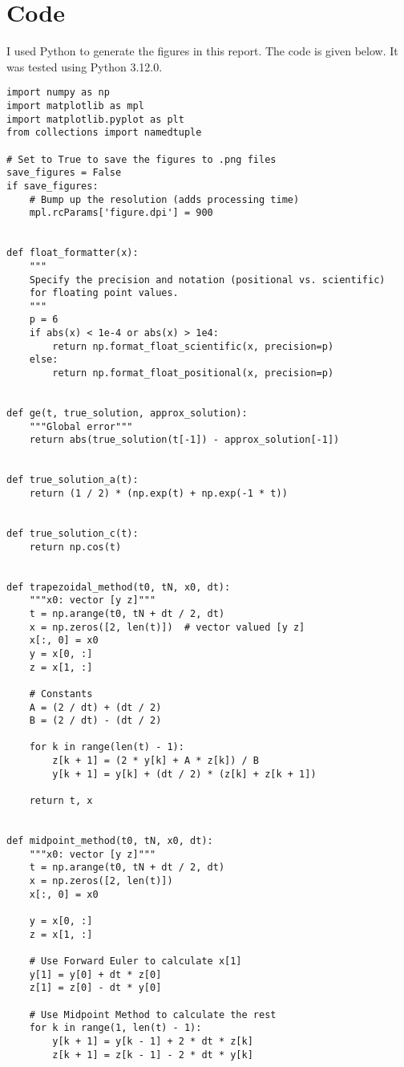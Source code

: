 \documentclass{article}
\begin{document}
\section{Code}
I used Python to generate the figures in this report.  The code is given below.  It was tested using Python 3.12.0.
\begin{verbatim}
import numpy as np
import matplotlib as mpl
import matplotlib.pyplot as plt
from collections import namedtuple

# Set to True to save the figures to .png files
save_figures = False
if save_figures:
    # Bump up the resolution (adds processing time)
    mpl.rcParams['figure.dpi'] = 900


def float_formatter(x):
    """
    Specify the precision and notation (positional vs. scientific)
    for floating point values.
    """
    p = 6
    if abs(x) < 1e-4 or abs(x) > 1e4:
        return np.format_float_scientific(x, precision=p)
    else:
        return np.format_float_positional(x, precision=p)


def ge(t, true_solution, approx_solution):
    """Global error"""
    return abs(true_solution(t[-1]) - approx_solution[-1])


def true_solution_a(t):
    return (1 / 2) * (np.exp(t) + np.exp(-1 * t))


def true_solution_c(t):
    return np.cos(t)


def trapezoidal_method(t0, tN, x0, dt):
    """x0: vector [y z]"""
    t = np.arange(t0, tN + dt / 2, dt)
    x = np.zeros([2, len(t)])  # vector valued [y z]
    x[:, 0] = x0
    y = x[0, :]
    z = x[1, :]

    # Constants
    A = (2 / dt) + (dt / 2)
    B = (2 / dt) - (dt / 2)

    for k in range(len(t) - 1):
        z[k + 1] = (2 * y[k] + A * z[k]) / B
        y[k + 1] = y[k] + (dt / 2) * (z[k] + z[k + 1])

    return t, x


def midpoint_method(t0, tN, x0, dt):
    """x0: vector [y z]"""
    t = np.arange(t0, tN + dt / 2, dt)
    x = np.zeros([2, len(t)])
    x[:, 0] = x0

    y = x[0, :]
    z = x[1, :]

    # Use Forward Euler to calculate x[1]
    y[1] = y[0] + dt * z[0]
    z[1] = z[0] - dt * y[0]

    # Use Midpoint Method to calculate the rest
    for k in range(1, len(t) - 1):
        y[k + 1] = y[k - 1] + 2 * dt * z[k]
        z[k + 1] = z[k - 1] - 2 * dt * y[k]


\end{verbatim}
\end{document}

